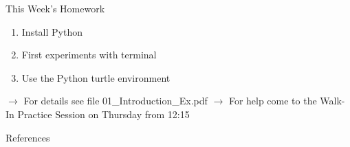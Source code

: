 \begin{frame}{This Week's Homework}

    \begin{enumerate}
        \item Install Python
        \item First experiments with terminal
        \item Use the Python turtle environment
    \end{enumerate}

    \vspace*{1em}

    $\rightarrow$ For details see file 01\_Introduction\_Ex.pdf \newline
    $\rightarrow$ For help come to the Walk-In Practice Session on Thursday from 12:15


\end{frame}

\begin{frame}{References}
    \printbibliography[]
\end{frame}


